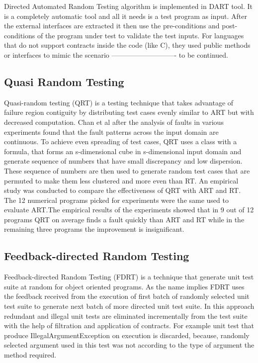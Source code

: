 Directed Automated Random Testing algorithm is implemented in DART tool. It is a completely automatic tool and all it needs is a test program as input. After the external interfaces are extracted it then use the pre-conditions and post-conditions of the program under test to validate the test inputs. For languages that do not support contracts inside the code (like C), they used public methods or interfaces to mimic the scenario  ---------------------------- to be continued.

\subsection{Quasi Random Testing}
Quasi-random testing (QRT) \cite{Chen2005} is a testing technique that takes advantage of failure region contiguity by distributing test cases evenly similar to ART but with decreased computation. Chan et al after the analysis of faults in various experiments found that the fault patterns across the input domain are continuous. To achieve even spreading of test cases, QRT uses a class with a formula, that forms an s-dimensional cube in s-dimensional input domain and generate sequence of numbers that have small discrepancy and low dispersion. These sequence of numbers are then used to generate random test cases that are permuted to make them less clustered and more even than RT. An empirical study was conducted to compare the effectiveness of QRT with ART and RT. The 12 numerical programs picked for experiments were the same used to evaluate ART.The empirical results of the experiments showed that in 9 out of 12 programs QRT on average finds a fault quickly than ART and RT while in the remaining three programs the improvement is insignificant.


\subsection{Feedback-directed Random Testing}
Feedback-directed Random Testing (FDRT) \cite{Pacheco2007} is a technique that generate unit test suite at random for object oriented programs. As the name implies FDRT uses the feedback received from the execution of first batch of randomly selected unit test suite to generate next batch of more directed unit test suite. In this approach redundant and illegal unit tests are eliminated incrementally from the test suite with the help of filtration and application of contracts. For example unit test that produce IllegalArgumentException on execution is discarded, because, randomly selected argument used in this test was not according to the type of argument the method required.

